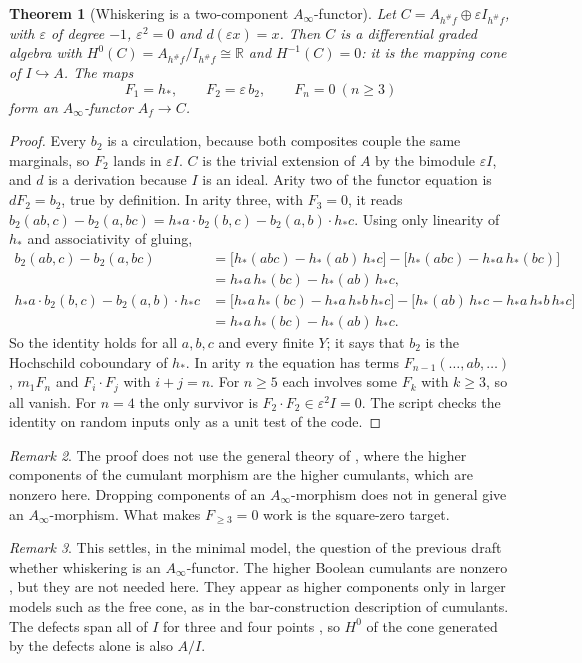 \documentclass[11pt]{article}
\newtheorem{theorem}{Theorem}[section]
\theoremstyle{definition}
\theoremstyle{remark}
\newtheorem{remark}[theorem]{Remark}
\begin{document}
\begin{theorem}[Whiskering is a two-component $A_\infty$-functor]\label{thm:sqzero}
Let $C=A_{h^\#f}\oplus\varepsilon I_{h^\#f}$, with $\varepsilon$ of degree $-1$, $\varepsilon^2=0$ and $d(\varepsilon x)=x$. Then $C$ is a differential graded
algebra with $H^0(C)=A_{h^\#f}/I_{h^\#f}\cong\mathbb R$ and $H^{-1}(C)=0$: it is the mapping cone of $I\hookrightarrow A$. The maps
\[
F_1=h_*,\qquad F_2=\varepsilon\,b_2,\qquad F_n=0\ (n\ge3)
\]
form an $A_\infty$-functor $A_f\to C$.
\end{theorem}
\begin{proof}
Every $b_2$ is a circulation, because both composites couple the same marginals, so $F_2$ lands in $\varepsilon I$. $C$ is the
trivial extension of $A$ by the bimodule $\varepsilon I$, and $d$ is a derivation because $I$ is an ideal. Arity two of the functor
equation is $dF_2=b_2$, true by definition. In arity three, with $F_3=0$, it reads
$b_2(ab,c)-b_2(a,bc)=h_*a\cdot b_2(b,c)-b_2(a,b)\cdot h_*c$. Using only linearity of $h_*$ and associativity of gluing,
\begin{align*}
b_2(ab,c)-b_2(a,bc)&=\bigl[h_*(abc)-h_*(ab)\,h_*c\bigr]-\bigl[h_*(abc)-h_*a\,h_*(bc)\bigr]\\
&=h_*a\,h_*(bc)-h_*(ab)\,h_*c,\\
h_*a\cdot b_2(b,c)-b_2(a,b)\cdot h_*c&=\bigl[h_*a\,h_*(bc)-h_*a\,h_*b\,h_*c\bigr]-\bigl[h_*(ab)\,h_*c-h_*a\,h_*b\,h_*c\bigr]\\
&=h_*a\,h_*(bc)-h_*(ab)\,h_*c.
\end{align*}
So the identity holds for all $a,b,c$ and every finite $Y$; it says that $b_2$ is the Hochschild coboundary of $h_*$. In
arity $n$ the equation has terms $F_{n-1}(\dots,ab,\dots)$, $m_1F_n$ and $F_i\cdot F_j$ with $i+j=n$. For $n\ge5$ each involves
some $F_k$ with $k\ge3$, so all vanish. For $n=4$ the only survivor is $F_2\cdot F_2\in\varepsilon^2I=0$.
The script checks the identity on random inputs only as a unit test of the code.
\end{proof}

\begin{remark}
The proof does not use the general theory of \cite{HPT1,HPT2}, where the higher components of the cumulant
morphism are the higher cumulants, which are nonzero here. Dropping components of an $A_\infty$-morphism does not in general
give an $A_\infty$-morphism. What makes $F_{\ge3}=0$ work is the square-zero target.
\end{remark}

\begin{remark}
This settles, in the minimal model, the question of the previous draft whether whiskering is an $A_\infty$-functor.
The higher Boolean cumulants are nonzero \cite[\S9]{Awasthi-Family}, but they are not needed here. They appear as
higher components only in larger models such as the free cone, as in the bar-construction description of
cumulants. The defects span all of $I$ for three and four points \cite[\S10]{Awasthi-Family}, so $H^0$ of the cone
generated by the defects alone is also $A/I$.
\end{remark}
\end{document}
